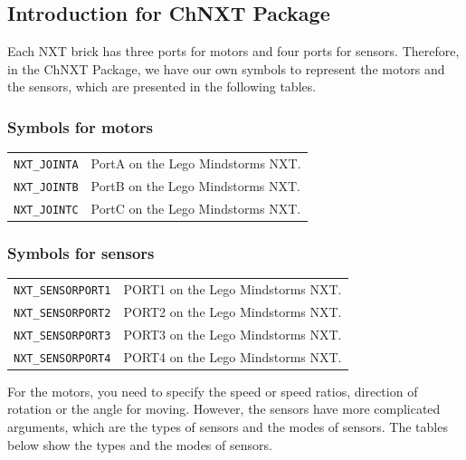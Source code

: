 \documentclass[11pt]{article}
\begin{document}
\subsection{\label{sec:basic_intro}Introduction for ChNXT Package}
Each NXT brick has three ports for motors and four ports for sensors.
Therefore, in the ChNXT Package, we have our own symbols to represent the motors
and the sensors, which are presented in the following tables.

\subsubsection*{Symbols for motors}
\begin{longtable}{p{3.5cm}p{12cm}}
\hline 
{\tt NXT\_JOINTA} & PortA on the Lego Mindstorms NXT. \\
{\tt NXT\_JOINTB} & PortB on the Lego Mindstorms NXT. \\
{\tt NXT\_JOINTC} & PortC on the Lego Mindstorms NXT. \\
\hline
\end{longtable}

\newpage
\subsubsection*{Symbols for sensors}
\begin{longtable}{p{3.5cm}p{12cm}}
\hline
{\tt NXT\_SENSORPORT1}&PORT1 on the Lego Mindstorms NXT.\\
{\tt NXT\_SENSORPORT2}&PORT2 on the Lego Mindstorms NXT.\\
{\tt NXT\_SENSORPORT3}&PORT3 on the Lego Mindstorms NXT.\\
{\tt NXT\_SENSORPORT4}&PORT4 on the Lego Mindstorms NXT.\\
\hline
\end{longtable}
For the motors, you need to specify the speed or speed ratios, direction of 
rotation or the angle for moving. However, the sensors have more complicated 
arguments, which are the types of sensors and the modes of sensors. The tables 
below show the types and the modes of sensors.
\end{document}
